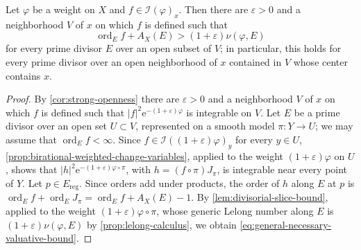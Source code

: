 \begin{proposition}\label{prop:general-necessary-valuative-bound}
Let $\varphi$ be a weight on $X$ and $f\in\mathcal I(\varphi)_x$. Then there are $\varepsilon>0$ and a neighborhood $V$ of $x$ on which $f$ is defined such that
\begin{equation}\label{eq:general-necessary-valuative-bound}
 \operatorname{ord}_E f+A_X(E)>(1+\varepsilon)\nu(\varphi,E)
\end{equation}
for every prime divisor $E$ over an open subset of $V$; in particular, this holds for every prime divisor over an open neighborhood of $x$ contained in $V$ whose center contains $x$.
\end{proposition}
\begin{proof}
By \cref{cor:strong-openness} there are $\varepsilon>0$ and a neighborhood $V$ of $x$ on which $f$ is defined such that $|f|^2\mathrm e^{-(1+\varepsilon)\varphi}$ is integrable on $V$. Let $E$ be a prime divisor over an open set $U\subset V$, represented on a smooth model $\pi\colon Y\to U$; we may assume that $\operatorname{ord}_Ef<\infty$. Since $f\in\mathcal I((1+\varepsilon)\varphi)_y$ for every $y\in U$, \cref{prop:birational-weighted-change-variables}, applied to the weight $(1+\varepsilon)\varphi$ on $U$, shows that $|h|^2\mathrm e^{-(1+\varepsilon)\varphi\circ\pi}$, with $h=(f\circ\pi)J_\pi$, is integrable near every point of $Y$. Let $p\in E_{\mathrm{reg}}$. Since orders add under products, the order of $h$ along $E$ at $p$ is $\operatorname{ord}_Ef+\operatorname{ord}_EJ_\pi=\operatorname{ord}_Ef+A_X(E)-1$. By \cref{lem:divisorial-slice-bound}, applied to the weight $(1+\varepsilon)\varphi\circ\pi$, whose generic Lelong number along $E$ is $(1+\varepsilon)\nu(\varphi,E)$ by \cref{prop:lelong-calculus}, we obtain \eqref{eq:general-necessary-valuative-bound}.
\end{proof}

